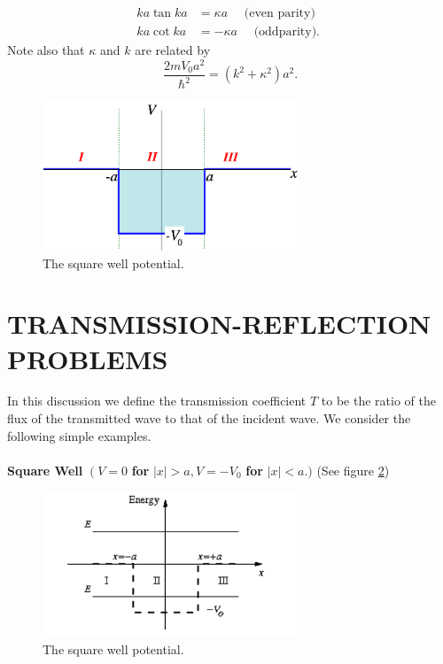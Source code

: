 \documentclass{article}
\begin{document}
\begin{equation}
\begin{array}{ll}
k a \tan k a & =\kappa a \quad  \text { (even parity) } \\
k a \cot k a & =-\kappa a \quad \text { (oddparity). }
\end{array}
\end{equation}
Note also that $\kappa$ and $k$ are related by
\begin{equation}
\frac{2 m V_{0} a^{2}}{\hbar^{2}}=\left(k^{2}+\kappa^{2}\right) a^{2}.
\end{equation}

\begin{figure}[h]
    \centering
    \includegraphics[width=3.0in]{img2.png}
    \caption{The square well potential.} \label{fig2}
\end{figure}
\section{TRANSMISSION-REFLECTION PROBLEMS}

In this discussion we define the transmission coefficient $T$ to be the ratio of the flux of the transmitted wave to that of the incident wave. We consider the following simple examples.
\\
\\
\textbf{Square Well} $\left(V=0\right.$ \textbf{for} $|x|>a, V=-V_{0}$ \textbf{for} $|x|<a$.$)$ (See figure \ref{fig3})
\\
\begin{figure}[h]
    \centering
    \includegraphics[width=3.0in]{img3.png}
    \caption{The square well potential.} \label{fig3}
\end{figure}
\end{document}

